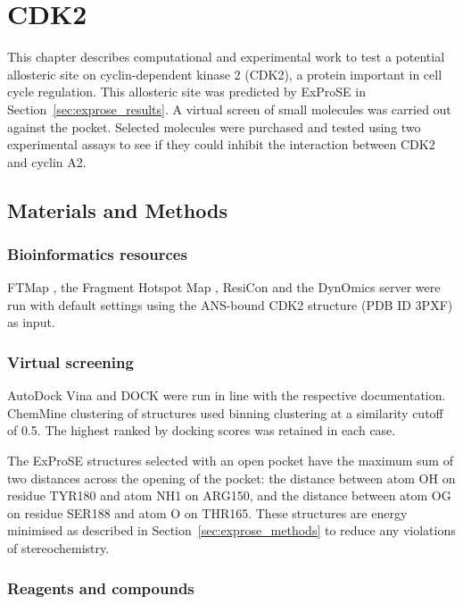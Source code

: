 \chapter{CDK2}
\label{cha:cdk2}

This chapter describes computational and experimental work to test a potential allosteric site on cyclin-dependent kinase 2 (CDK2), a protein important in cell cycle regulation.
This allosteric site was predicted by ExProSE in Section~\ref{sec:exprose_results}.
A virtual screen of small molecules was carried out against the pocket.
Selected molecules were purchased and tested using two experimental assays to see if they could inhibit the interaction between CDK2 and cyclin A2.


\section{Materials and Methods}
\label{sec:cdk2_methods}


\subsection{Bioinformatics resources}

FTMap \cite{Kozakov2015}, the Fragment Hotspot Map \cite{Radoux2016}, ResiCon \cite{Dziubinski2016} and the DynOmics server \cite{Li2017} were run with default settings using the ANS-bound CDK2 structure (PDB ID 3PXF) as input.


\subsection{Virtual screening}

AutoDock Vina \cite{Trott2010} and DOCK \cite{Allen2015} were run in line with the respective documentation.
ChemMine \cite{Backman2011} clustering of structures used binning clustering at a similarity cutoff of 0.5.
The highest ranked by docking scores was retained in each case.

The ExProSE structures selected with an open pocket have the maximum sum of two distances across the opening of the pocket: the distance between atom OH on residue TYR180 and atom NH1 on ARG150, and the distance between atom OG on residue SER188 and atom O on THR165.
These structures are energy minimised as described in Section~\ref{sec:exprose_methods} to reduce any violations of stereochemistry.


\subsection{Reagents and compounds}

